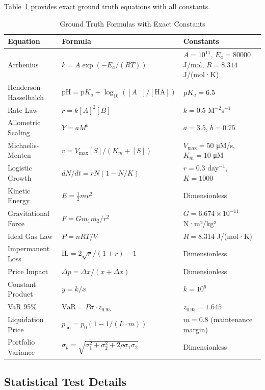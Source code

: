 Table~\ref{tab:formulas_detailed} provides exact ground truth equations with all constants.

\begin{table}[htbp]
\centering
\caption{Ground Truth Formulas with Exact Constants}
\label{tab:formulas_detailed}
\tiny
\begin{tabular}{lll}
\toprule
\textbf{Equation} & \textbf{Formula} & \textbf{Constants} \\
\midrule
Arrhenius & $k = A\exp(-E_a/(RT))$ & $A=10^{11}$, $E_a=80000$ J/mol, $R=8.314$ J/(mol·K) \\
Henderson-Hasselbalch & $\text{pH} = \text{p}K_a + \log_{10}([A^-]/[\text{HA}])$ & $\text{p}K_a = 6.5$ \\
Rate Law & $r = k[A]^2[B]$ & $k = 0.5$ M$^{-2}$s$^{-1}$ \\
Allometric Scaling & $Y = aM^b$ & $a = 3.5$, $b = 0.75$ \\
Michaelis-Menten & $v = V_{\max}[S]/(K_m + [S])$ & $V_{\max} = 50$ μM/s, $K_m = 10$ μM \\
Logistic Growth & $dN/dt = rN(1-N/K)$ & $r = 0.3$ day$^{-1}$, $K = 1000$ \\
Kinetic Energy & $E = \frac{1}{2}mv^2$ & Dimensionless \\
Gravitational Force & $F = Gm_1m_2/r^2$ & $G = 6.674 \times 10^{-11}$ N·m²/kg² \\
Ideal Gas Law & $P = nRT/V$ & $R = 8.314$ J/(mol·K) \\
Impermanent Loss & $\text{IL} = 2\sqrt{r}/(1+r) - 1$ & Dimensionless \\
Price Impact & $\Delta p = \Delta x/(x + \Delta x)$ & Dimensionless \\
Constant Product & $y = k/x$ & $k = 10^6$ \\
VaR 95\% & $\text{VaR} = P\sigma \cdot z_{0.95}$ & $z_{0.95} = 1.645$ \\
Liquidation Price & $p_{\text{liq}} = p_0(1 - 1/(L \cdot m))$ & $m = 0.8$ (maintenance margin) \\
Portfolio Variance & $\sigma_p = \sqrt{\sigma_1^2 + \sigma_2^2 + 2\rho\sigma_1\sigma_2}$ & Dimensionless \\
\bottomrule
\end{tabular}
\end{table}

\subsection{Statistical Test Details}

